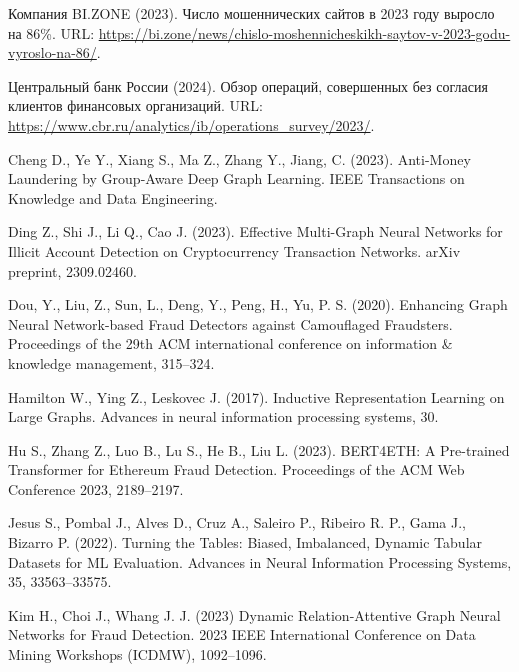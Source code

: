 \documentclass[a4paper,article,14pt]{extarticle}
\begin{document}



\tableofcontents
\pagebreak








\begin{thebibliography}{1}

 Компания BI.ZONE (2023). \flqq Число мошеннических сайтов в 2023 году выросло на 86\%\frqq. URL: \url{https://bi.zone/news/chislo-moshennicheskikh-saytov-v-2023-godu-vyroslo-na-86/}.

 Центральный банк России (2024). \flqq Обзор операций, совершенных без согласия клиентов финансовых организаций\frqq. URL: \url{https://www.cbr.ru/analytics/ib/operations_survey/2023/}.

 Cheng D., Ye Y., Xiang S., Ma Z., Zhang Y., Jiang, C. (2023). \flqq Anti-Money Laundering by Group-Aware Deep Graph Learning\frqq. IEEE Transactions on Knowledge and Data Engineering.

 Ding Z., Shi J., Li Q., Cao J. (2023). \flqq Effective Multi-Graph Neural Networks for Illicit Account Detection on Cryptocurrency Transaction Networks\frqq. arXiv preprint, 2309.02460.

 Dou, Y., Liu, Z., Sun, L., Deng, Y., Peng, H., Yu, P. S. (2020). \flqq Enhancing Graph Neural Network-based Fraud Detectors against Camouflaged Fraudsters\frqq. Proceedings of the 29th ACM international conference on information \& knowledge management, 315--324.

 Hamilton W., Ying Z., Leskovec J. (2017). \flqq Inductive Representation Learning on Large Graphs\frqq. Advances in neural information processing systems, 30.

 Hu S., Zhang Z., Luo B., Lu S., He B., Liu L. (2023). \flqq BERT4ETH: A Pre-trained Transformer for Ethereum Fraud Detection\frqq. Proceedings of the ACM Web Conference 2023, 2189--2197.

 Jesus S., Pombal J., Alves D., Cruz A., Saleiro P., Ribeiro R. P., Gama J., Bizarro P. (2022). \flqq Turning the Tables: Biased, Imbalanced, Dynamic Tabular Datasets for ML Evaluation\frqq. Advances in Neural Information Processing Systems, 35, 33563--33575.

 Kim H., Choi J., Whang J. J. (2023) \flqq Dynamic Relation-Attentive Graph Neural Networks for Fraud Detection\frqq. 2023 IEEE International Conference on Data Mining Workshops (ICDMW), 1092--1096.


\end{thebibliography}
\end{document}
